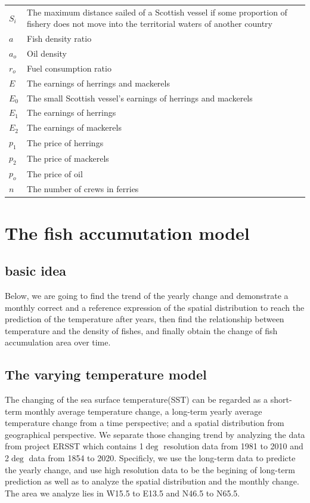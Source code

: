 \documentclass{mcmthesis}
\begin{document}
\begin{center}
\begin{longtable}{p{}p{}m{}}
$S_i$      & The maximum distance sailed of a Scottish vessel   if  some proportion of fishery does not move  into the territorial waters of another country \\
$a$      & Fish density ratio \\
$a_o$      & Oil density \\
$r_o$      & Fuel consumption ratio \\
$E$      & The earnings  of herrings and mackerels \\
$E_0$      & The small Scottish vessel's earnings  of herrings and mackerels \\
$E_1$      & The earnings  of herrings\\
$E_2$      & The earnings  of mackerels\\
$p_1$      & The price  of herrings \\
$p_2$      & The price  of mackerels  \\
$p_o$      & The price  of oil  \\
$n$      & The number  of  crews in ferries \\



 \end{longtable}
 \end{center}

 \section{The fish accumutation model}
 \subsection{basic idea}
    Below, we are going to find the trend of the yearly change and demonstrate a monthly correct and a reference expression of the spatial distribution to reach the prediction of the temperature after years, then find the relationship between temperature and the density of fishes, and finally obtain the change of fish accumulation area over time. 
 \subsection{The varying temperature model}
 
  
    The changing of the sea surface temperature(SST) can be regarded as a short-term monthly average temperature change, a long-term yearly average temperature change from a time perspective; and a spatial distribution from geographical perspective. 
    We separate those changing trend by analyzing the data from project ERSST which contains 1$\deg$ resolution data from 1981 to 2010 and 2$\deg$ data from 1854 to 2020. Specificly, we use the long-term data to predicte the yearly change, and use high resolution data to be the begining of long-term prediction as well as to analyze the spatial distribution and the monthly change. The area we analyze lies in W15.5 to E13.5 and N46.5 to N65.5.
    
\end{document}
